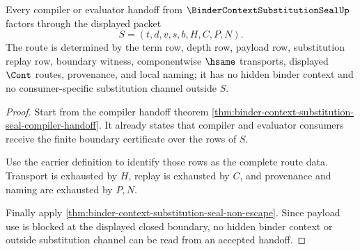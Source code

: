 \begin{theorem}
\label{thm:binder-context-substitution-seal-route-determinacy}
Every compiler or evaluator handoff from $\BinderContextSubstitutionSealUp$ factors through the displayed packet
$$
S=(t,d,v,s,b,H,C,P,N).
$$
The route is determined by the term row, depth row, payload row, substitution replay row, boundary witness, componentwise $\hsame$ transports, displayed $\Cont$ routes, provenance, and local naming; it has no hidden binder context and no consumer-specific substitution channel outside $S$.
\end{theorem}
\begin{proof}
Start from the compiler handoff theorem \autoref{thm:binder-context-substitution-seal-compiler-handoff}. It already states that compiler and evaluator consumers receive the finite boundary certificate over the rows of $S$.

Use the carrier definition to identify those rows as the complete route data. Transport is exhausted by $H$, replay is exhausted by $C$, and provenance and naming are exhausted by $P,N$.

Finally apply \autoref{thm:binder-context-substitution-seal-non-escape}. Since payload use is blocked at the displayed closed boundary, no hidden binder context or outside substitution channel can be read from an accepted handoff.
\end{proof}

